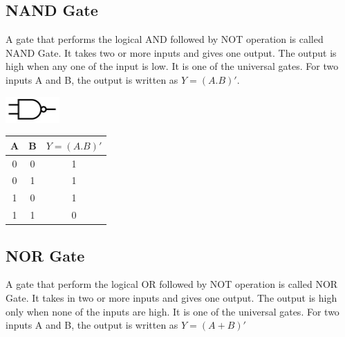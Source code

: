 \documentclass[a4paper, 12pt]{article}
\begin{document}
\subsection{NAND Gate}
A gate that performs the logical AND followed by NOT operation is called NAND Gate. It takes two or more inputs and gives one output. The output is high when any one of the input is low. It is one of the universal gates. For two inputs A and B, the output is written as $Y = (A.B)'$.

\begin{minipage}[c]{.5\textwidth}
  \centering
    \includegraphics{nand-gate}
\end{minipage}
\begin{minipage}{.5\textwidth}
  \begin{center}
    \begin{tabular}{ |c|c|c| }
      \hline
      A & B & $Y = (A.B)'$ \\
      \hline
      0 & 0 & 1 \\
      \hline
      0 & 1 & 1 \\
      \hline
      1 & 0 & 1 \\
      \hline
      1 & 1 & 0 \\
      \hline
    \end{tabular}
  \end{center}
\end{minipage}


\subsection{NOR Gate}
A gate that perform the logical OR followed by NOT operation is called NOR Gate. It takes in two or more inputs and gives one output. The output is high only when none of the inputs are high. It is one of the universal gates. For two inputs A and B, the output is written as $Y = (A + B)'$
\end{document}

